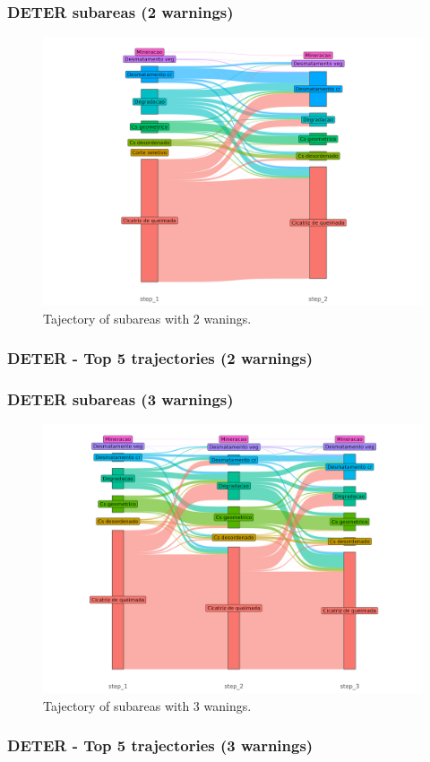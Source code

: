 \documentclass[aspectratio=169]{beamer}
\begin{document}
\begin{frame}
    \frametitle{DETER subareas (2 warnings)}
    \begin{figure}[h] 
        \includegraphics[width=0.65\linewidth]
        {./figures/plot_deter_subarea_trajectory_2.png}
        \caption{Tajectory of subareas with 2 wanings.}
        \label{fig:deter_subarea_trajectory_2}
    \end{figure}
\end{frame}

\begin{frame}[allowframebreaks]
    \frametitle{DETER - Top 5 trajectories (2 warnings)}
    
\end{frame}

\begin{frame}
    \frametitle{DETER subareas (3 warnings)}
    \begin{figure}[h] 
        \includegraphics[width=0.65\linewidth]
        {./figures/plot_deter_subarea_trajectory_3.png}
        \caption{Tajectory of subareas with 3 wanings.}
        \label{fig:deter_subarea_trajectory_3}
    \end{figure}
\end{frame}

\begin{frame}[allowframebreaks]
    \frametitle{DETER - Top 5 trajectories (3 warnings)}
    
\end{frame}
\end{document}
